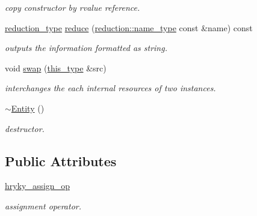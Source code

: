 \begin{DoxyCompactItemize}
\begin{DoxyCompactList}\small\item\em copy constructor by rvalue reference. \end{DoxyCompactList}\item 
\hypertarget{classhryky_1_1http_1_1body_1_1_entity_aed8aa2c1d02b468dcb15d9d1c046f1f8}{\hyperlink{namespacehryky_a343a9a4c36a586be5c2693156200eadc}{reduction\-\_\-type} \hyperlink{classhryky_1_1http_1_1body_1_1_entity_aed8aa2c1d02b468dcb15d9d1c046f1f8}{reduce} (\hyperlink{namespacehryky_1_1reduction_ac686c30a4c8d196bbd0f05629a6b921f}{reduction\-::name\-\_\-type} const \&name) const }\label{classhryky_1_1http_1_1body_1_1_entity_aed8aa2c1d02b468dcb15d9d1c046f1f8}

\begin{DoxyCompactList}\small\item\em outputs the information formatted as string. \end{DoxyCompactList}\item 
\hypertarget{classhryky_1_1http_1_1body_1_1_entity_a19af79142d3bb486ea9109a5059d9188}{void \hyperlink{classhryky_1_1http_1_1body_1_1_entity_a19af79142d3bb486ea9109a5059d9188}{swap} (\hyperlink{classhryky_1_1http_1_1body_1_1_entity_a2f6e32c9f4a71f736d8960863e75f36a}{this\-\_\-type} \&src)}\label{classhryky_1_1http_1_1body_1_1_entity_a19af79142d3bb486ea9109a5059d9188}

\begin{DoxyCompactList}\small\item\em interchanges the each internal resources of two instances. \end{DoxyCompactList}\item 
\hypertarget{classhryky_1_1http_1_1body_1_1_entity_a37da81d62b9bbe6abc103a7bb446f573}{\hyperlink{classhryky_1_1http_1_1body_1_1_entity_a37da81d62b9bbe6abc103a7bb446f573}{$\sim$\-Entity} ()}\label{classhryky_1_1http_1_1body_1_1_entity_a37da81d62b9bbe6abc103a7bb446f573}

\begin{DoxyCompactList}\small\item\em destructor. \end{DoxyCompactList}\end{DoxyCompactItemize}
\subsection*{Public Attributes}
\begin{DoxyCompactItemize}
\item 
\hypertarget{classhryky_1_1http_1_1body_1_1_entity_a7464a78a7889981664df71b56bcd7dc2}{\hyperlink{classhryky_1_1http_1_1body_1_1_entity_a7464a78a7889981664df71b56bcd7dc2}{hryky\-\_\-assign\-\_\-op}}\label{classhryky_1_1http_1_1body_1_1_entity_a7464a78a7889981664df71b56bcd7dc2}

\begin{DoxyCompactList}\small\item\em assignment operator. \end{DoxyCompactList}\end{DoxyCompactItemize}


